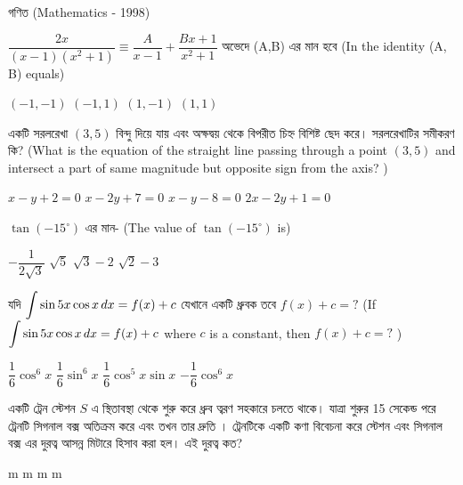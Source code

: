 \documentclass[addpoints]{exam}
\begin{document}
\begin{LARGE}
\begin{center}
গণিত (Mathematics - 1998)
\end{center}
\end{LARGE}
\begin{questions}

     \question  $ \dfrac{2x}{(x-1)(x^2 +1)} \equiv \dfrac{A}{x-1} + \dfrac{Bx+1}{x^2 +1} $  অভেদে (A,B) এর মান হবে (In the identity (A, B) equals)

\begin{oneparchoices}
\choice $ (-1,-1) $
\choice $ (-1, 1) $
\choice $ (1,-1) $
\choice  $ (1,1) $
\end{oneparchoices}

\question একটি সরলরেখা $(3,5)$ বিন্দু দিয়ে যায় এবং অক্ষদ্বয় থেকে বিপরীত চিহ্ন বিশিষ্ট ছেদ করে। সরলরেখাটির সমীকরণ কি? (What is the equation of the straight line passing through a point $(3,5)$ and intersect a part of same magnitude but opposite sign from the axis? ) 

\begin{oneparchoices}
\choice $ x-y+2=0 $
\choice $ x-2y+7=0 $
\choice $ x-y-8=0 $
\choice $ 2x-2y+1=0 $
\end{oneparchoices}


\question  $ \tan (-15^{\circ}) $ এর মান- (The value of  $ \tan (-15^{\circ}) $ is)

\begin{oneparchoices}
\choice  $ -\dfrac{1}{2\sqrt{3}} $
\choice  $ \sqrt{5} $
\choice  $ \sqrt{3} - 2 $
\choice  $ \sqrt{2}- 3 $
\end{oneparchoices}

\question যদি $ \mathlarger{\int}\sin 5x\cos x\, dx =f(x) + c $  যেখানে একটি ধ্রুবক তবে $ f(x)+c = ?$ (If $ \mathlarger{\int}\sin 5x\cos x\, dx =f(x) + c $ where $ c $ is a constant, then $ f(x)+c =? $ )


\begin{oneparchoices}
\choice  $ \dfrac{1}{6}\cos^{6} x $
\choice  $ \dfrac{1}{6}\sin^{6}x $
\choice  $ \dfrac{1}{6}\cos^{5}x\sin x $
\choice  $ -\dfrac{1}{6}\cos^{6}x $
\end{oneparchoices}


\question একটি ট্রেন স্টেশন $ S  $ এ স্থিতাবস্থা থেকে শুরু করে ধ্রুব ত্বরণ সহকারে চলতে থাকে। যাত্রা শুরুর 15 সেকেন্ড পরে ট্রেনটি সিগনাল বক্স অতিক্রম করে এবং তখন তার দ্রুতি । ট্রেনটিকে একটি কণা বিবেচনা করে স্টেশন এবং সিগনাল বক্স এর দুরত্ব আসন্ন মিটারে হিসাব করা হল। এই দুরত্ব কত?

\begin{oneparchoices}
 m
 m
 m
 m
\end{oneparchoices}


\end{questions}
\end{document}
